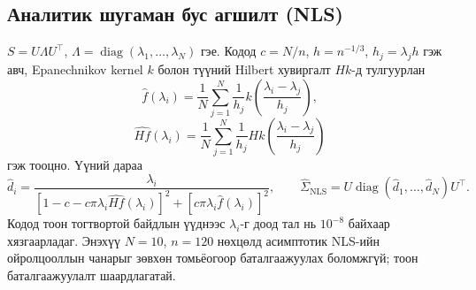 \subsection{Аналитик шугаман бус агшилт (NLS)}
$S=U\Lambda U^\top$, $\Lambda=\operatorname{diag}
(\lambda_1,\ldots,\lambda_N)$ гэе. Кодод
$c=N/n$, $h=n^{-1/3}$, $h_j=\lambda_jh$ гэж авч,
Epanechnikov kernel $k$ болон түүний Hilbert
хувиргалт $Hk$-д тулгуурлан
\[
 \widehat f(\lambda_i)=\frac1N\sum_{j=1}^N
 \frac{1}{h_j}k\!\left(\frac{\lambda_i-\lambda_j}{h_j}\right),
\]
\[
 \widehat{Hf}(\lambda_i)=\frac1N\sum_{j=1}^N
 \frac{1}{h_j}Hk\!\left(\frac{\lambda_i-\lambda_j}{h_j}\right)
\]
гэж тооцно. Үүний дараа
\[
 \widehat d_i=\frac{\lambda_i}{
 [1-c-c\pi\lambda_i\widehat{Hf}(\lambda_i)]^2+
 [c\pi\lambda_i\widehat f(\lambda_i)]^2},\qquad
 \widehat\Sigma_{\mathrm{NLS}}=
 U\operatorname{diag}(\widehat d_1,\ldots,\widehat d_N)U^\top.
\]
Кодод тоон тогтвортой байдлын үүднээс $\lambda_i$-г
доод тал нь $10^{-8}$ байхаар хязгаарладаг.
Энэхүү $N=10$, $n=120$ нөхцөлд асимптотик
NLS-ийн ойролцооллын чанарыг зөвхөн томьёогоор
баталгаажуулах боломжгүй; тоон баталгаажуулалт
шаардлагатай.

